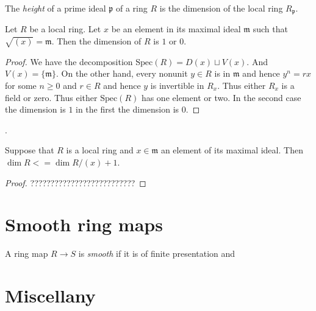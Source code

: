 \begin{definition}
\label{definition-height}
The {\it height} of a prime ideal $\mathfrak p$ of
a ring $R$ is the dimension of the local ring $R_{\mathfrak p}$.
\end{definition}

\begin{lemma}
\label{lemma-height-1}
Let $R$ be a local ring. Let $x$ be an element 
in its maximal ideal $\mathfrak m$ such that
$\sqrt{(x)} = \mathfrak m$. Then the dimension
of $R$ is $1$ or $0$.
\end{lemma}

\begin{proof}
We have the decomposition $\text{Spec}(R)
= D(x) \sqcup V(x)$. And $V(x) = \{\mathfrak m\}$.
On the other hand, every nonunit $y \in R$ is in
$\mathfrak m$ and hence $y^n = rx$ for some $n \geq 0$ and
$r \in R$ and hence $y$ is invertible in $R_x$. Thus either
$R_x$ is a field or zero. Thus either $\text{Spec}(R)$
has one element or two. In the second case the dimension
is $1$ in the first the dimension is $0$.
\end{proof}.

\begin{lemma}
\label{lemma-one-equation}
Suppose that $R$ is a local ring and $x\in \mathfrak m$ an
element of its maximal ideal. 
Then $\dim R <= \dim R/(x) + 1$.
\end{lemma}

\begin{proof}
??????????????????????????
\end{proof}


















\section{Smooth ring maps}
\label{section-smooth}

\begin{definition}
\label{definition-smooth}
A ring map $R \to S$ is {\it smooth} if it is of finite presentation
and 
\end{definition}

\section{Miscellany}
\label{section-miscellany}

